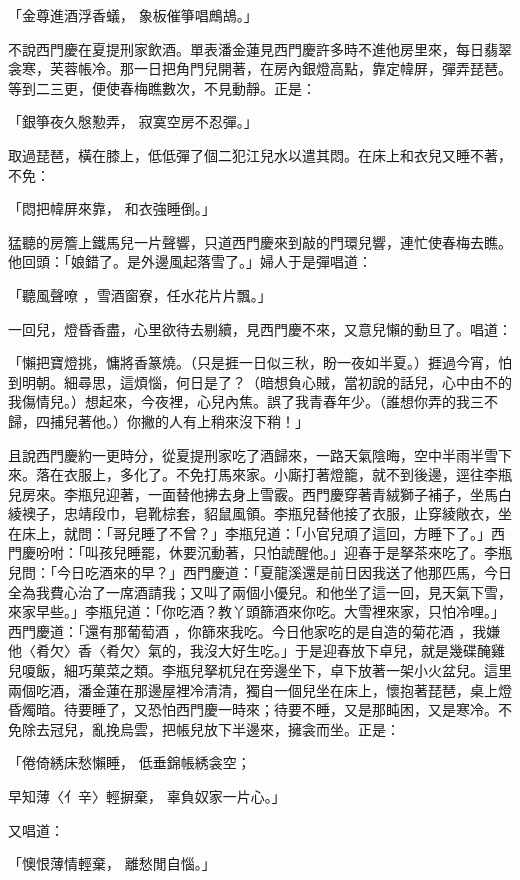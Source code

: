 「金尊進酒浮香蟻，  象板催箏唱鷓鴣。」

不說西門慶在夏提刑家飲酒。單表潘金蓮見西門慶許多時不進他房里來，每日翡翠衾寒，芙蓉帳冷。那一日把角門兒開著，在房內銀燈高點，靠定幃屏，彈弄琵琶。等到二三更，便使春梅瞧數次，不見動靜。正是：

「銀箏夜久慇懃弄，  寂寞空房不忍彈。」

取過琵琶，橫在膝上，低低彈了個二犯江兒水以遣其悶。在床上和衣兒又睡不著，不免：

「悶把幃屏來靠，  和衣強睡倒。」

猛聽的房簷上鐵馬兒一片聲響，只道西門慶來到敲的門環兒響，連忙使春梅去瞧。他回頭：「娘錯了。是外邊風起落雪了。」婦人于是彈唱道：

「聽風聲嘹 ，雪酒窗寮，任水花片片飄。」

一回兒，燈昏香盡，心里欲待去剔續，見西門慶不來，又意兒懶的動旦了。唱道：

「懶把寶燈挑，慵將香篆燒。（只是捱一日似三秋，盼一夜如半夏。）捱過今宵，怕到明朝。細尋思，這煩惱，何日是了？（暗想負心賊，當初說的話兒，心中由不的我傷情兒。）想起來，今夜裡，心兒內焦。誤了我青春年少。（誰想你弄的我三不歸，四捕兒著他。）你撇的人有上稍來沒下稍！」

且說西門慶約一更時分，從夏提刑家吃了酒歸來，一路天氣陰晦，空中半雨半雪下來。落在衣服上，多化了。不免打馬來家。小廝打著燈籠，就不到後邊，逕往李瓶兒房來。李瓶兒迎著，一面替他拂去身上雪霰。西門慶穿著青絨獅子補子，坐馬白綾襖子，忠靖段巾，皂靴棕套，貂鼠風領。李瓶兒替他接了衣服，止穿綾敞衣，坐在床上，就問：「哥兒睡了不曾？」李瓶兒道：「小官兒頑了這回，方睡下了。」西門慶吩咐：「叫孩兒睡罷，休要沉動著，只怕諕醒他。」迎春于是拏茶來吃了。李瓶兒問：「今日吃酒來的早？」西門慶道：「夏龍溪還是前日因我送了他那匹馬，今日全為我費心治了一席酒請我；又叫了兩個小優兒。和他坐了這一回，見天氣下雪，來家早些。」李瓶兒道：「你吃酒？教丫頭篩酒來你吃。大雪裡來家，只怕冷哩。」西門慶道：「還有那葡萄酒 ，你篩來我吃。今日他家吃的是自造的菊花酒 ，我嫌他〈肴欠〉香〈肴欠〉氣的，我沒大好生吃。」于是迎春放下卓兒，就是幾碟醃雞兒嗄飯，細巧菓菜之類。李瓶兒拏杌兒在旁邊坐下，卓下放著一架小火盆兒。這里兩個吃酒，潘金蓮在那邊屋裡冷清清，獨自一個兒坐在床上，懷抱著琵琶，桌上燈昏燭暗。待要睡了，又恐怕西門慶一時來；待要不睡，又是那盹困，又是寒冷。不免除去冠兒，亂挽烏雲，把帳兒放下半邊來，擁衾而坐。正是：

「倦倚綉床愁懶睡，  低垂錦帳綉衾空；

早知薄〈亻辛〉輕摒棄，  辜負奴家一片心。」

又唱道：

「懊恨薄情輕棄，  離愁閒自惱。」

